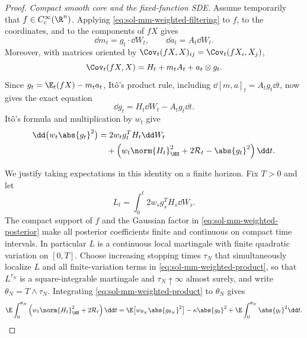 \documentclass[../main.tex]{subfiles}
\begin{document}
\begin{proof}
\medskip
\noindent\emph{Compact smooth core and the fixed-function SDE.}
Assume temporarily that $f\in C_c^\infty(\R^n)$.  Applying
\eqref{eq:sol-mm-weighted-filtering} to $f$, to the coordinates, and to the components of
$fX$ gives
\[
  \dd m_t=g_t\cdot\dd W_t,
  \qquad
  \dd a_t=A_t\dd W_t.
\]
Moreover, with matrices oriented by
$\Cov_t(fX,X)_{ij}=\Cov_t(fX_i,X_j)$,
\[
  \Cov_t(fX,X)=H_t+m_tA_t+a_t\otimes g_t.
\]
Since $g_t=\E_t(fX)-m_ta_t$, It\^o's product rule, including
$\dd[m,a]_t=A_tg_t\dd t$, now gives the exact equation
\begin{equation}
  \dd g_t=H_t\dd W_t-A_tg_t\dd t.
  \label{eq:sol-mm-weighted-g-sde}
\end{equation}
It\^o's formula and multiplication by $w_t$ give
\begin{align}
  \dd\bigl(w_t\abs{g_t}^2\bigr)
  &=2w_tg_t^TH_t\dd W_t \notag\\
  &\quad+
  \left(w_t\norm{H_t}_{\HS}^2+2\mathcal R_t-\abs{g_t}^2\right)\dd t.
  \label{eq:sol-mm-weighted-product}
\end{align}

We justify taking expectations in this identity on a finite horizon.  Fix $T>0$ and let
\[
  L_t=\int_0^t2w_sg_s^TH_s\dd W_s.
\]
The compact support of $f$ and the Gaussian factor in
\eqref{eq:sol-mm-weighted-posterior} make all posterior coefficients finite and continuous on
compact time intervals.  In particular $L$ is a continuous local martingale with finite
quadratic variation on $[0,T]$.  Choose increasing stopping times $\tau_N$ that simultaneously
localize $L$ and all finite-variation terms in \eqref{eq:sol-mm-weighted-product}, so that
$L^{\tau_N}$ is a square-integrable martingale and $\tau_N\uparrow\infty$ almost surely, and
write $\theta_N=T\wedge\tau_N$.  Integrating
\eqref{eq:sol-mm-weighted-product} to $\theta_N$ gives
\begin{equation}
 \E\int_0^{\theta_N}
 \left(w_t\norm{H_t}_{\HS}^2+2\mathcal R_t\right)\dd t
 =\E\bigl[w_{\theta_N}\abs{g_{\theta_N}}^2\bigr]
  -\kappa\abs{g_0}^2
  +\E\int_0^{\theta_N}\abs{g_t}^2\dd t.
 \label{eq:sol-mm-weighted-stopped-ito}
\end{equation}


\end{proof}
\end{document}
